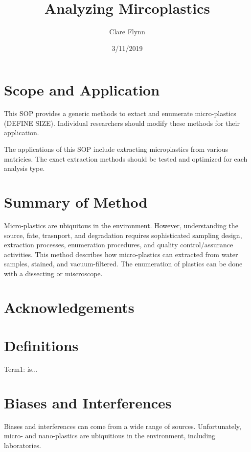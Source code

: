 \documentclass[12pt]{../SOP4_alpha}\usepackage[]{graphicx}\usepackage[]{color}
\title{Analyzing Mircoplastics}
\date{3/11/2019}
\author{Clare Flynn}
\begin{document}
\maketitle

\section{Scope and Application}

\NP This SOP provides a generic methods to extact and enumerate micro-plastics (DEFINE SIZE). Individual researchers should modify these methods for their application. 

\NP The applications of this SOP include extracting microplastics from various matricies. The exact extraction methods should be tested and optimized for each analysis type.

\section{Summary of Method}

\NP Micro-plastics are ubiquitous in the environment. However, understanding the source, fate, trasnport, and degradation requires sophisticated sampling design, extraction processes, enumeration procedures, and quality control/assurance activities. This method describes how micro-plastics can extracted from water samples, stained, and vacuum-filtered. The enumeration of plastics can be done with a dissecting or miscroscope. 

\tableofcontents

\newpage

\section{Acknowledgements}

\section{Definitions}

\NP Term1: is...

\section{Biases and Interferences}

\NP Biases and interferences can come from a wide range of sources. Unfortunately, micro- and nano-plastics are ubiquitious in the environment, including laboratories.
\end{document}
